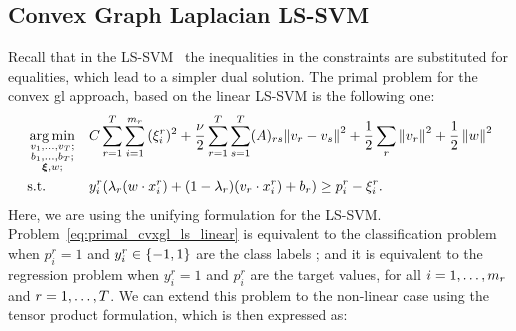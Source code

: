 \subsection{Convex Graph Laplacian LS-SVM}
Recall that in the LS-SVM~\citep{SuykensV99} the inequalities in the constraints are substituted for equalities, which lead to a simpler dual solution.
The primal problem for the convex \acrshort{gl} approach, based on the linear LS-SVM is the following one:
\begin{equation}\label{eq:primal_cvxgl_ls_linear}
    \begin{aligned}
         & \argmin_{\substack{v_1, \ldots, v_\ntasks ;                                                                                                                                                                                                                                                                                          \\ \substack{b_1, \ldots, b_\ntasks } ; \\ \substack{\fv{\xi}}, w; }}
         &                                             & { C \sum_{r=1}^\ntasks \sum_{i=1}^{\npertask_r} {(\xi_i^r)^2}  + \frac{\nu}{2} \sum_{r=1}^\ntasks \sum_{s=1}^T (A)_{rs} {\| {v}_r - {v}_s \|}^2 + \frac{1}{2} \sum_r \norm{{v}_r}^2 + \frac{1}{2} \norm{{w}}^2}                                                                              \\
         & \text{s.t.}
         &                                             & y_i^r (\lambda_r ({w} \cdot {x}_i^r) + (1 - \lambda_r) ({v}_r \cdot {x}_i^r) + b_r) \geq p_i^r - \xi_i^r  .
    \end{aligned}
\end{equation}
Here, we are using the unifying formulation for the LS-SVM. Problem~\eqref{eq:primal_cvxgl_ls_linear} is equivalent to the classification problem when $p_i^r=1$ and $y_i^r \in \left\{-1, 1\right\}$ are the class labels ; and it is equivalent to the regression problem when $y_i^r=1$ and $p_i^r$ are the target values, for all $i=1, \ldots, m_r$ and $r=1, \ldots, T$.
%
We can extend this problem to the non-linear case using the tensor product formulation, which is then expressed as:
